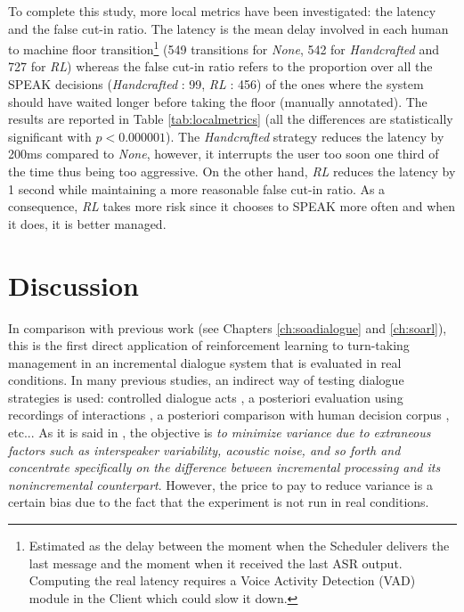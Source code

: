        To complete this study, more local metrics have been investigated: the latency and the false cut-in ratio. The latency is the mean delay involved in each human to machine floor transition\footnote{Estimated as the delay between the moment when the Scheduler delivers the last message and the moment when it received the last ASR output. Computing the real latency requires a Voice Activity Detection (VAD) module in the Client which could slow it down.} (549 transitions for \textit{None}, 542 for \textit{Handcrafted} and 727 for \textit{RL}) whereas the false cut-in ratio refers to the proportion over all the SPEAK decisions (\textit{Handcrafted} : 99, \textit{RL} : 456) of the ones where the system should have waited longer before taking the floor (manually annotated). The results are reported in Table \ref{tab:localmetrics} (all the differences are statistically significant with $p < 0.000001$). The \textit{Handcrafted} strategy reduces the latency by 200ms compared to \textit{None}, however, it interrupts the user too soon one third of the time thus being too aggressive. On the other hand, \textit{RL} reduces the latency by 1 second while maintaining a more reasonable false cut-in ratio. As a consequence, \textit{RL} takes more risk since it chooses to SPEAK more often and when it does, it is better managed.

\section{Discussion}

        In comparison with previous work (see Chapters \ref{ch:soadialogue} and \ref{ch:soarl}), this is the first direct application of reinforcement learning to turn-taking management in an incremental dialogue system that is evaluated in real conditions. In many previous studies, an indirect way of testing dialogue strategies is used: controlled dialogue acts \cite{Aist2007}, a posteriori evaluation using recordings of interactions \cite{Meena2013}, a posteriori comparison with human decision corpus \cite{Jonsdottir2008,Dethlefs2012}, etc... As it is said in \cite{Aist2007}, the objective is \textit{to minimize variance due to extraneous factors such as interspeaker variability, acoustic noise, and so forth and concentrate specifically on the difference between incremental processing and its nonincremental counterpart}. However, the price to pay to reduce variance is a certain bias due to the fact that the experiment is not run in real conditions.

